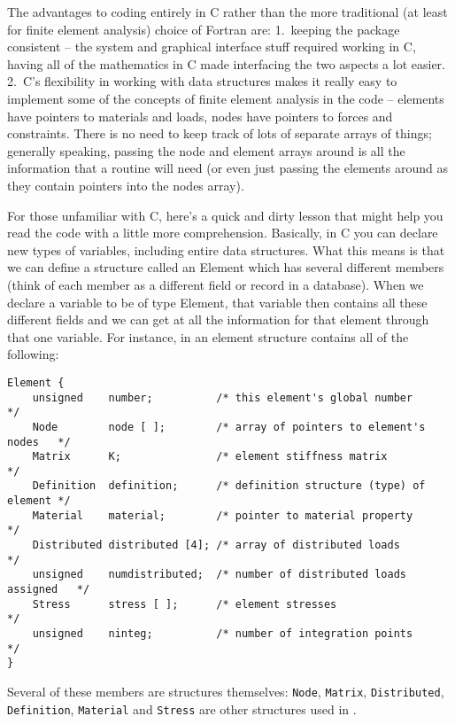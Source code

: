 The advantages to coding \felt{} entirely in C rather than the more traditional 
(at least for finite element analysis) choice of Fortran are: 1.~keeping the 
package consistent -- the system and graphical interface stuff required working 
in C, having all of the mathematics in C made interfacing the two aspects a 
lot easier. 2.~C's flexibility in working with data structures makes it really 
easy to implement some of the concepts of finite element analysis in the 
code -- elements have pointers to materials and loads, nodes have pointers to 
forces and constraints.  There is no need to keep track of lots of separate 
arrays of things; generally speaking, passing the node and element arrays 
around is all the information that a routine will need (or even just passing 
the elements around as they contain pointers into the nodes array).  	

For those unfamiliar with C, here's a quick and dirty lesson that might help 
you read the code with a little more comprehension.  Basically, in C you can 
declare new types of variables, including entire data structures.  What this 
means is that we can define a structure called an Element which has several 
different members (think of each member as a different field or record in a 
database).  When we declare a variable to be of type Element, that variable 
then contains all these different fields and we can get at all the information 
for that element through that one variable.  For instance, in \felt{} an 
element structure contains all of the following:

{\small
\begin{screen}
 \begin{verbatim}
Element {	
    unsigned    number;          /* this element's global number           */
    Node        node [ ];        /* array of pointers to element's nodes   */
    Matrix      K;               /* element stiffness matrix               */
    Definition  definition;      /* definition structure (type) of element */ 
    Material    material;        /* pointer to material property           */	
    Distributed	distributed [4]; /* array of distributed loads             */ 	
    unsigned    numdistributed;  /* number of distributed loads assigned   */
    Stress      stress [ ];      /* element stresses                       */
    unsigned    ninteg;          /* number of integration points           */
}
 \end{verbatim}
\end{screen}}

Several of these members are structures themselves: {\tt Node}, {\tt Matrix}, 
{\tt Distributed}, {\tt Definition}, {\tt Material} and {\tt Stress} are 
other structures used in \felt{}.	

